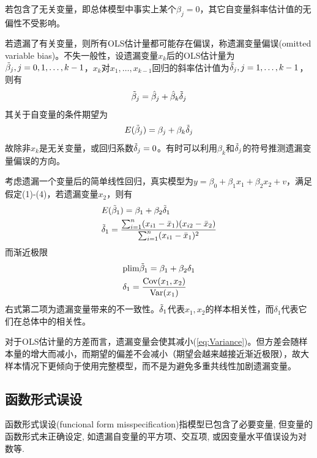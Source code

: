 \par 若包含了无关变量，即总体模型中事实上某个$\beta_j=0$，其它自变量斜率估计值的无偏性不受影响。

\par 若遗漏了有关变量，则所有OLS估计量都可能存在偏误，称遗漏变量偏误(omitted variable bias)。不失一般性，设遗漏变量$x_k$后的OLS估计量为$\Tilde{\beta}_j,j=0,1,\dots,k-1$，$x_k$对$x_1,\dots,x_{k-1}$回归的斜率估计值为$\Tilde{\delta}_j,j=1,\dots,k-1$，则有
\begin{equation}
    \Tilde{\beta}_j=\hat{\beta}_j+\hat{\beta}_k\Tilde{\delta}_j
\end{equation}
其关于自变量的条件期望为
\begin{equation}
    E(\Tilde{\beta}_j)=\beta_j+\beta_k\Tilde{\delta}_j
\end{equation}
故除非$x_k$是无关变量，或回归系数$\Tilde{\delta}_j=0$。有时可以利用$\beta_k$和$\Tilde{\delta}_j$的符号推测遗漏变量偏误的方向。

\par 考虑遗漏一个变量后的简单线性回归，真实模型为$y=\beta_0+\beta_1x_1+\beta_2x_2+v$，满足假定(1)-(4)，若遗漏变量$x_2$，则有
\begin{align}
    &E(\Tilde{\beta}_1)=\beta_1+\beta_2\Tilde{\delta}_1\\ &\Tilde{\delta}_1=\frac{\sum_{i=1}^n (x_{i1}-\bar{x}_1)(x_{i2}-\bar{x}_2)}{\sum_{i=1}^n (x_{i1}-\bar{x}_1)^2}
\end{align}
而渐近极限
\begin{align}
    &\text{plim}\Tilde{\beta}_1=\beta_1+\beta_2\delta_1\\ &\delta_1=\frac{\text{Cov}(x_1,x_2)}{\text{Var}(x_1)}
\end{align}
右式第二项为遗漏变量带来的不一致性。$\Tilde{\delta}_1$代表$x_1,x_2$的样本相关性，而$\delta_1$代表它们在总体中的相关性。

\par 对于OLS估计量的方差而言，遗漏变量会使其减小(\ref{eq:Variance})。但方差会随样本量的增大而减小，而期望的偏差不会减小（期望会越来越接近渐近极限），故大样本情况下更倾向于使用完整模型，而不是为避免多重共线性加剧遗漏变量。

\subsection{函数形式误设}

\par 函数形式误设(funcional form misspecification)指模型已包含了必要变量, 但变量的函数形式未正确设定, 如遗漏自变量的平方项、交互项, 或因变量水平值误设为对数等. 

